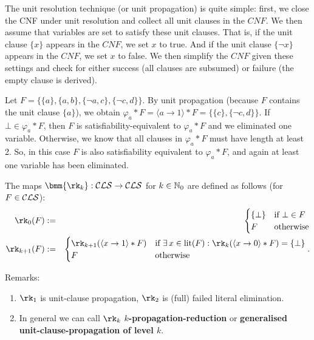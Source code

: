 \documentclass[12pt]{book}
\begin{document}
The unit resolution technique (or unit propagation) is quite simple: first, we close the CNF under unit resolution and collect all unit 
clauses in the $CNF$. We then assume that variables are set to satisfy these unit clauses. That is, if the unit clause $\{x\}$ appears 
in the $CNF$, we set $x$ to true. And if the unit clause $\{\neg x\}$ appears in the $CNF$, we set $x$ to false. We then simplify the 
$CNF$ given these settings and check for either success (all clauses are subsumed) or failure (the empty clause is derived)\cite{h6}.

\begin{examp}\label{exp:unit1}
      Let $F=\{ \{a\}, \{a, b\}, \{\neg a, c\}, \{\neg c, d\}\}$. By unit propagation (because $F$ contains the unit clause $\{a\}$), 
	  we obtain $\varphi_a * F=\langle a \rightarrow 1 \rangle * F= \{ \{c\}, \{\neg c, d\}\}$. If $\bot \in \varphi_a * F$, then $F$ is 
	  satisfiability-equivalent to $\varphi_a * F$ and we eliminated one variable. Otherwise, we know that all clauses in $\varphi_a * F$ 
	  must have length at least 2. So, in this case $F$ is also satisfiability equivalent to $\varphi_a * F$, and again at least one 
	  variable has been eliminated.
\end{examp}

\begin{defi}\label{def:rk}
  The maps $\bmm{\rk_k}: \Cls \ra \Cls$ for $k \in \mathbb{N}_0$ are defined as follows (for $F \in \mathcal{CLS}$):
  \begin{eqnarray*}
    \rk_0(F) & := &
    \begin{cases}
      \set{\bot} & \text{if } \bot \in F\\
      F & \text{otherwise}
    \end{cases}\\
    \rk_{k+1}(F) & := &
    \begin{cases}
      \rk_{k+1}(\pao x1 * F) & \text{if } \ex\, x \in \lit(F) : \rk_k(\pao x0 * F) = \set{\bot}\\
      F & \text{otherwise}
    \end{cases}.
  \end{eqnarray*}
\end{defi}
Remarks:
\begin{enumerate}
\item $\rk_1$ is unit-clause propagation, $\rk_2$ is (full) failed literal elimination.
\item In general we can call $\rk_k$ \textbf{$k$-propagation-reduction} or \textbf{generalised unit-clause-propagation of level $k$}.
\end{enumerate}
\end{document}
